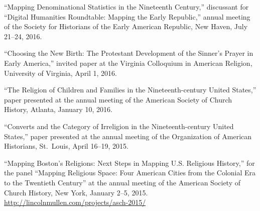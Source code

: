 \documentclass[11pt]{article}
\begin{document}
``Mapping Denominational Statistics in the Nineteenth Century,'' discussant 
for ``Digital Humanities Roundtable: Mapping the Early Republic,'' annual 
meeting of the Society for Historians of the Early American Republic, New 
Haven, July 21--24, 2016.

``Choosing the New Birth: The Protestant Development of the Sinner's Prayer in 
Early America,'' invited paper at the Virginia Colloquium in American 
Religion, University of Virginia, April 1, 2016.

``The Religion of Children and Families in the Nineteenth-century United 
States,'' paper presented at the annual meeting of the American Society of 
Church History, Atlanta, January 10, 2016.

``Converts and the Category of Irreligion in the Nineteenth-century
United States,'' paper presented at the annual meeting of the
Organization of American Historians, St.~Louis, April 16--19, 2015.

``Mapping Boston's Religions: Next Steps in Mapping U.S. Religious History,'' 
for the panel ``Mapping Religious Space: Four American Cities from the 
Colonial Era to the Twentieth Century'' at the annual meeting of the American 
Society of Church History, New York, January 2--5, 2015.  
\url{http://lincolnmullen.com/projects/asch-2015/}
\end{document}
